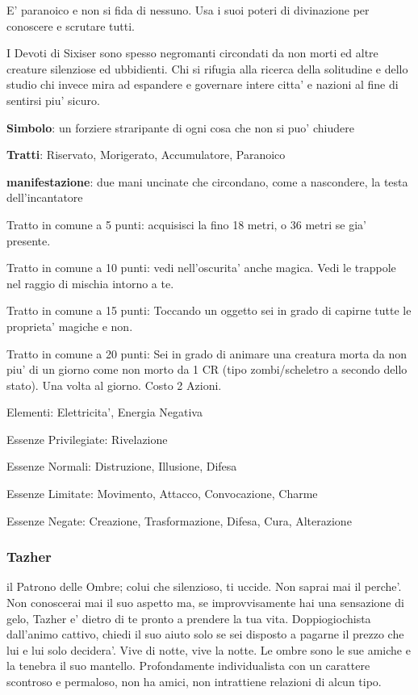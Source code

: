 \documentclass[a4paper,11pt,twoside,openany]{book}
\begin{document}
{E' paranoico e non si fida di nessuno. Usa i suoi poteri di divinazione per conoscere e scrutare tutti.

I Devoti di Sixiser sono spesso negromanti circondati da non morti ed altre creature silenziose ed ubbidienti. Chi si rifugia alla ricerca della solitudine e dello studio chi invece mira ad espandere e governare intere citta' e nazioni al fine di sentirsi piu' sicuro.

\textbf{Simbolo}: un forziere straripante di ogni cosa che non si puo' chiudere

\textbf{Tratti}: Riservato, Morigerato, Accumulatore, Paranoico

\textbf{manifestazione}: due mani uncinate che circondano, come a nascondere, la testa dell'incantatore

\bigskip

Tratto in comune a 5 punti: acquisisci la fino 18 metri, o 36 metri se gia' presente.

Tratto in comune a 10 punti: vedi nell'oscurita' anche magica. Vedi le trappole nel raggio di mischia intorno a te.

Tratto in comune a 15 punti: Toccando un oggetto sei in grado di capirne tutte le proprieta' magiche e non.

Tratto in comune a 20 punti: Sei in grado di animare una creatura morta da non piu' di un giorno come non morto da 1 CR (tipo zombi/scheletro a secondo dello stato). Una volta al giorno. Costo 2 Azioni.

\bigskip

Elementi: Elettricita', Energia Negativa

\bigskip

Essenze Privilegiate: Rivelazione

Essenze Normali: Distruzione, Illusione, Difesa

Essenze Limitate: Movimento, Attacco, Convocazione, Charme

Essenze Negate: Creazione, Trasformazione, Difesa, Cura, Alterazione

\subsubsection{Tazher}

\label{tazher}

il Patrono delle Ombre; colui che silenzioso, ti uccide. Non saprai mai il perche'. Non conoscerai mai il suo aspetto ma, se improvvisamente hai una sensazione di gelo, Tazher e' dietro di te pronto a prendere la tua vita. Doppiogiochista dall'animo cattivo, chiedi il suo aiuto solo se sei disposto a pagarne il prezzo che lui e lui solo decidera'. Vive di notte, vive la notte. Le ombre sono le sue amiche e la tenebra il suo mantello. Profondamente individualista con un carattere scontroso e permaloso, non ha amici, non intrattiene relazioni di alcun tipo.

}
\end{document}
